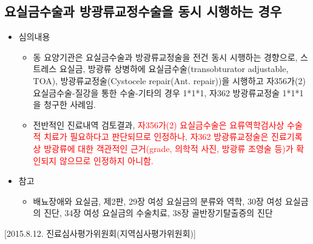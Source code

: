 \subsection{요실금수술과 방광류교정수술을 동시 시행하는 경우}
\begin{itemize}\tightlist
\item 심의내용 
	\begin{itemize}\tightlist
	\item 동 요양기관은 요실금수술과 방광류교정술을 전건 동시 시행하는 경향으로, 스트레스 요실금, 방광류 상병하에 요실금수술(transobturator adjustable, TOA), 방광류교정술(Cystocele repair(Ant. repair))을 시행하고 자356가(2) 요실금수술-질강을 통한 수술-기타의 경우 1*1*1, 자362 방광류교정술 1*1*1을 청구한 사례임. 
	\item 전반적인 진료내역 검토결과, \textcolor{red}{자356가(2) 요실금수술은 요류역학검사상 수술적 치료가 필요하다고 판단되므로 인정하나, 자362 방광류교정술은 진료기록상 방광류에 대한 객관적인 근거(grade, 의학적 사진, 방광류 조영술 등)가 확인되지 않으므로 인정하지 아니함. }
	\end{itemize}
\item 참고
	\begin{itemize}\tightlist
	\item 배뇨장애와 요실금, 제2판, 29장 여성 요실금의 분류와 역학, 30장 여성 요실금의 진단, 34장 여성 요실금의 수술치료, 38장 골반장기탈출증의 진단
	\end{itemize}
\end{itemize}
 [2015.8.12. 진료심사평가위원회(지역심사평가위원회)]



